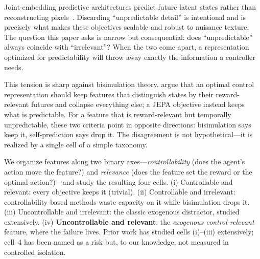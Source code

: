 \documentclass[11pt]{article}
\begin{document}
Joint-embedding predictive architectures predict future latent states rather than reconstructing
pixels~\citep{assran2023ijepa,vjepa2_2025}. Discarding ``unpredictable detail'' is intentional and
is precisely what makes these objectives scalable and robust to nuisance texture. The question this
paper asks is narrow but consequential: does ``unpredictable'' always coincide with
``irrelevant''? When the two come apart, a representation optimized for predictability will throw
away exactly the information a controller needs.

This tension is sharp against bisimulation theory. \citet{zhang2020dbc} argue that an optimal
control representation should keep features that distinguish states by their reward-relevant
futures and collapse everything else; a JEPA objective instead keeps what is predictable. For a
feature that is reward-relevant but temporally unpredictable, these two criteria point in opposite
directions: bisimulation says keep it, self-prediction says drop it. The disagreement is not
hypothetical---it is realized by a single cell of a simple taxonomy.

We organize features along two binary axes---\emph{controllability} (does the agent's action move
the feature?) and \emph{relevance} (does the feature set the reward or the optimal action?)---and
study the resulting four cells. (i) Controllable and relevant: every objective keeps it (trivial).
(ii) Controllable and irrelevant: controllability-based methods waste capacity on it while
bisimulation drops it. (iii) Uncontrollable and irrelevant: the classic exogenous distractor,
studied extensively. (iv) \textbf{Uncontrollable and relevant}: the \emph{exogenous
control-relevant} feature, where the failure lives. Prior work has studied cells (i)--(iii)
extensively; cell~4 has been named as a risk but, to our knowledge, not measured in controlled
isolation.
\end{document}
